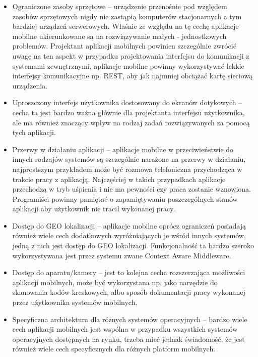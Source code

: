 \begin{itemize}
\item Ograniczone zasoby sprzętowe -- urządzenie przenośnie pod względem zasobów sprzętowych nigdy nie zastąpią komputerów stacjonarnych a tym bardziej urządzeń serwerowych. Właśnie ze względu na tę cechę aplikacje mobilne ukierunkowane są na rozwiązywanie małych - jednostkowych problemów. Projektant aplikacji mobilnych powinien szczególnie zwrócić uwagę na ten aspekt w przypadku projektowania interfejsu do komunikacji z systemami zewnętrznymi, aplikacje mobilne powinny wykorzystywać lekkie interfejsy komunikacyjne np. REST, aby jak najmniej obciążać kartę sieciową urządzenia. 
\item Uproszczony interfejs użytkownika dostosowany do ekranów dotykowych -- cecha ta jest bardzo ważna głównie dla projektanta interfejsu użytkownika, ale ma również znaczący wpływ na rodzaj zadań rozwiązywanych za pomocą tych aplikacji.  
\item Przerwy w działaniu aplikacji -- aplikacje mobilne w przeciwieństwie do innych rodzajów systemów są szczególnie narażone na przerwy w działaniu, najprostszym przykładem może być rozmowa telefoniczna przychodząca w trakcie pracy z aplikacją. Najczęściej w takich przypadkach aplikacje przechodzą w tryb uśpienia i nie ma pewności czy praca zostanie wznowiona. Programiści powinny pamiętać o zapamiętywaniu poszczególnych stanów aplikacji aby użytkownik nie tracił wykonanej pracy. 
\item Dostęp do GEO lokalizacji -- aplikacje mobilne oprócz ograniczeń posiadają również wiele cech dodatkowych wyróżniających je wśród innych systemów, jedną z nich jest dostęp do GEO lokalizacji.  Funkcjonalność ta bardzo szeroko wykorzystywana jest przez systemu zwane Context Aware Middleware. 
\item Dostęp do aparatu/kamery -- jest to kolejna cecha rozszerzająca możliwości aplikacji mobilnych, może być wykorzystana np. jako narzędzie do skanowania kodów kreskowych, albo sposób dokumentacji pracy wykonanej przez użytkownika systemów mobilnych. 
\item Specyficzna architektura dla różnych systemów operacyjnych -- bardzo wiele cech aplikacji mobilnych jest wspólna w przypadku wszystkich systemów operacyjnych dostępnych na rynku, trzeba mieć jednak świadomość, że jest również wiele cech specyficznych dla różnych platform mobilnych. 
\end{itemize}


